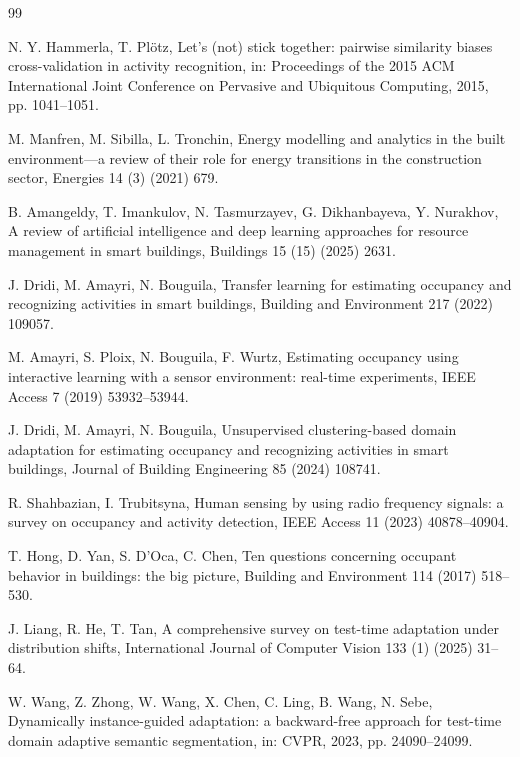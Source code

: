 \documentclass[a4paper,fleqn]{cas-dc}
\begin{document}
\begin{thebibliography}{99}

 N. Y. Hammerla, T. Pl\"otz, Let's (not) stick together: pairwise
similarity biases cross-validation in activity recognition, in: Proceedings of the 2015
ACM International Joint Conference on Pervasive and Ubiquitous Computing, 2015,
pp. 1041--1051.

 M. Manfren, M. Sibilla, L. Tronchin, Energy modelling and analytics
in the built environment---a review of their role for energy transitions in the
construction sector, Energies 14 (3) (2021) 679.

 B. Amangeldy, T. Imankulov, N. Tasmurzayev, G. Dikhanbayeva,
Y. Nurakhov, A review of artificial intelligence and deep learning approaches for resource
management in smart buildings, Buildings 15 (15) (2025) 2631.

 J. Dridi, M. Amayri, N. Bouguila, Transfer learning for estimating
occupancy and recognizing activities in smart buildings, Building and Environment 217
(2022) 109057.

 M. Amayri, S. Ploix, N. Bouguila, F. Wurtz, Estimating occupancy using
interactive learning with a sensor environment: real-time experiments, IEEE Access 7 (2019)
53932--53944.

 J. Dridi, M. Amayri, N. Bouguila, Unsupervised clustering-based
domain adaptation for estimating occupancy and recognizing activities in smart buildings,
Journal of Building Engineering 85 (2024) 108741.

 R. Shahbazian, I. Trubitsyna, Human sensing by using radio
frequency signals: a survey on occupancy and activity detection, IEEE Access 11 (2023)
40878--40904.

 T. Hong, D. Yan, S. D'Oca, C. Chen, Ten questions concerning occupant
behavior in buildings: the big picture, Building and Environment 114 (2017) 518--530.

 J. Liang, R. He, T. Tan, A comprehensive survey on test-time adaptation
under distribution shifts, International Journal of Computer Vision 133 (1) (2025) 31--64.

 W. Wang, Z. Zhong, W. Wang, X. Chen, C. Ling, B. Wang, N. Sebe, Dynamically
instance-guided adaptation: a backward-free approach for test-time domain adaptive semantic
segmentation, in: CVPR, 2023, pp. 24090--24099.


\end{thebibliography}
\end{document}

